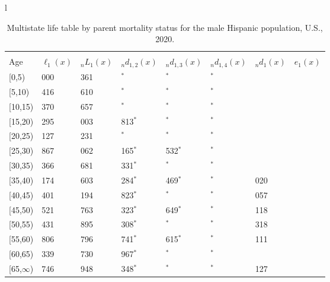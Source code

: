 \documentclass[
]{article}
\begin{document}
\begin{table}
\caption{\label{tab:table-hispanic-male}Multistate life table by parent mortality status for the male Hispanic population, U.S., 2020.}

\centering
\fontsize{9}{11}\selectfont
\begin{tabular}[t]{l}
\hline
\begin{tabular}{>{\raggedright\arraybackslash}p{.45in}>{\raggedleft\arraybackslash}p{.65in}>{\raggedleft\arraybackslash}p{.65in}>{\raggedleft\arraybackslash}p{.65in}>{\raggedleft\arraybackslash}p{.65in}>{\raggedleft\arraybackslash}p{.65in}>{\raggedleft\arraybackslash}p{.65in}>{\raggedleft\arraybackslash}p{.65in}}
\toprule
\multicolumn{1}{c}{ } & \multicolumn{7}{c}{(1) Lost neither} \\
\cmidrule(l{3pt}r{3pt}){2-8}
Age & $\ell_{1}(x)$ & ${}_nL_{1}(x)$ & ${}_nd_{1,2}(x)$ & ${}_nd_{1,3}(x)$ & ${}_nd_{1,4}(x)$ & ${}_nd_{1}(x)$ & $e_{1}(x)$\\
\midrule
{}[0,5) & 100 000 & 496 361 & 0$^{*}$ & 0$^{*}$ & 0$^{*}$ & 584 & 46\\
{}[5,10) & 99 416 & 492 610 & 0$^{*}$ & 0$^{*}$ & 0$^{*}$ & 46 & 41\\
{}[10,15) & 99 370 & 483 657 & 0$^{*}$ & 0$^{*}$ & 0$^{*}$ & 75 & 36\\
{}[15,20) & 99 295 & 475 003 & 3 813$^{*}$ & 0$^{*}$ & 0$^{*}$ & 355 & 32\\
{}[20,25) & 95 127 & 467 231 & 595$^{*}$ & 0$^{*}$ & 0$^{*}$ & 665 & 27\\
\addlinespace
{}[25,30) & 93 867 & 443 062 & 2 165$^{*}$ & 2 532$^{*}$ & 0$^{*}$ & 804 & 22\\
{}[30,35) & 88 366 & 418 681 & 2 331$^{*}$ & 0$^{*}$ & 0$^{*}$ & 860 & 18\\
{}[35,40) & 85 174 & 395 603 & 4 284$^{*}$ & 4 469$^{*}$ & 0$^{*}$ & 1 020 & 14\\
{}[40,45) & 75 401 & 321 194 & 7 823$^{*}$ & 0$^{*}$ & 0$^{*}$ & 1 057 & 10\\
{}[45,50) & 66 521 & 245 763 & 3 323$^{*}$ & 1 649$^{*}$ & 0$^{*}$ & 1 118 & 7\\
\addlinespace
{}[50,55) & 60 431 & 193 895 & 3 308$^{*}$ & 0$^{*}$ & 0$^{*}$ & 1 318 & 4\\
{}[55,60) & 55 806 & 103 796 & 1 741$^{*}$ & 2 615$^{*}$ & 0$^{*}$ & 1 111 & 2\\
{}[60,65) & 50 339 & 39 730 & 2 967$^{*}$ & 0$^{*}$ & 0$^{*}$ & 626 & 1\\
{}[65,$\infty$) & 46 746 & 35 948 & 3 348$^{*}$ & 0$^{*}$ & 0$^{*}$ & 2 127 & 0\\

\end{tabular}
\end{tabular}
\end{table}
\end{document}
